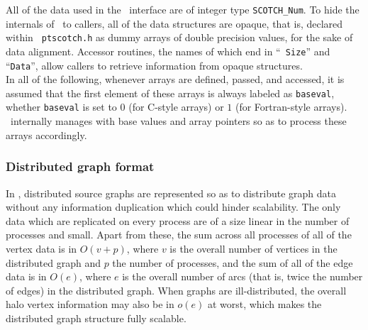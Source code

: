 All of the data used in the \libscotch\ interface are of integer type
{\tt SCOTCH\_Num}. To hide the internals of \ptscotch\ to callers, all
of the data structures are opaque, that is, declared within {\tt
ptscotch.h} as dummy arrays of double precision values, for the sake of
data alignment. Accessor routines, the names of which end in ``{\tt
Size}'' and ``{\tt Data}'', allow callers to retrieve information from
opaque structures.
\\

In all of the following, whenever arrays are defined, passed, and
accessed, it is assumed that the first element of these arrays is
always labeled as {\tt baseval}, whether {\tt baseval} is set to $0$
(for C-style arrays) or $1$ (for Fortran-style arrays). \ptscotch\
internally manages with base values and array pointers so as to
process these arrays accordingly.

\subsubsection{Distributed graph format}
\label{sec-lib-format-dgraph}

In \ptscotch, distributed source graphs are represented so as to
distribute graph data without any information duplication which could
hinder scalability. The only data which are replicated on every
process are of a size linear in the number of processes and
small. Apart from these, the sum across all processes of all of the
vertex data is in $O(v+p)$, where $v$ is the overall number of
vertices in the distributed graph and $p$ the number of processes, and
the sum of all of the edge data is in $O(e)$, where $e$ is the overall
number of arcs (that is, twice the number of edges) in the distributed
graph. When graphs are ill-distributed, the overall halo vertex
information may also be in $o(e)$ at worst, which makes the distributed
graph structure fully scalable.

